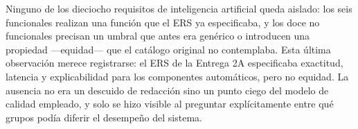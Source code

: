 \noindent
Ninguno de los dieciocho requisitos de inteligencia artificial queda aislado: los seis funcionales
realizan una función que el ERS ya especificaba, y los doce no funcionales precisan un umbral que
antes era genérico o introducen una propiedad ---equidad--- que el catálogo original no contemplaba.
Esta última observación merece registrarse: el ERS de la Entrega 2A especificaba exactitud, latencia
y explicabilidad para los componentes automáticos, pero no equidad. La ausencia no era un descuido de
redacción sino un punto ciego del modelo de calidad empleado, y solo se hizo visible al preguntar
explícitamente entre qué grupos podía diferir el desempeño del sistema.
